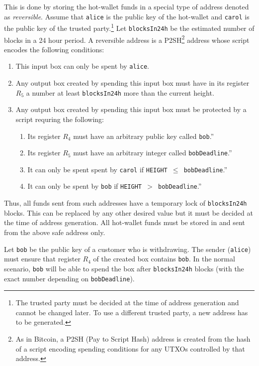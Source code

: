 \documentclass[11pt]{article}
\begin{document}
This is done by storing the hot-wallet funds in a special type of address denoted as {\em reversible}. Assume that \texttt{alice} is the public key of the hot-wallet and \texttt{carol} is the public key of the trusted party.\footnote{The trusted party must be decided at the time of address generation and cannot be changed later. To use a different trusted party, a new address has to be generated.} Let \texttt{blocksIn24h} be the estimated number of blocks in a 24 hour period. A reversible address is a P2SH\footnote{As in Bitcoin, a P2SH (Pay to Script Hash) address is created from the hash of a script encoding spending conditions for any UTXOs controlled by that address.} address whose script encodes the following conditions:   
\begin{enumerate}
	\item This input box can only be spent by \texttt{alice}.
	\item Any output box created by spending this input box must have in its register $R_5$ a number at least \texttt{blocksIn24h} more than the current height. 
	\item Any output box created by spending this input box must be protected by a script requring the following: 	
	\begin{enumerate}
		\item Its register $R_4$ must have an arbitrary public key called \texttt{bob}.'' 
		\item Its register $R_5$ must have an arbitrary integer called \texttt{bobDeadline}.'' 
		\item It can only be spent spent by \texttt{carol} if \texttt{HEIGHT $\leq$ bobDeadline}.''
		\item It can only be spent by \texttt{bob} if \texttt{HEIGHT $>$ bobDeadline}.''	
	\end{enumerate}  
\end{enumerate}

Thus, all funds sent from such addresses have a temporary lock of \texttt{blocksIn24h} blocks. This can be replaced by any other desired value but it must be decided at the time of address generation. All hot-wallet funds must be stored in and sent from the above safe address only. 

Let \texttt{bob} be the public key of a customer who is withdrawing. The sender (\texttt{alice}) must ensure that register $R_4$ of the created box contains \texttt{bob}. In the normal scenario, \texttt{bob} will be able to spend the box after \texttt{blocksIn24h} blocks (with the exact number depending on \texttt{bobDeadline}). 
\end{document}
